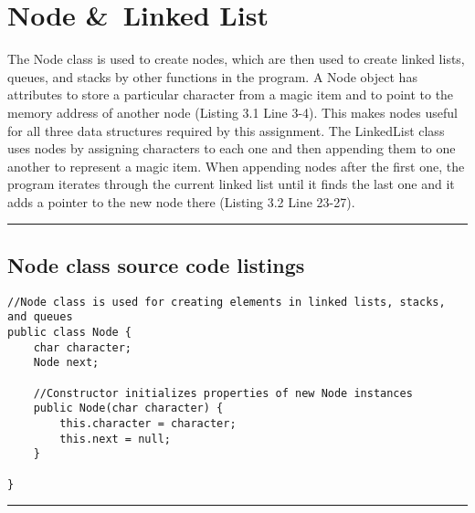 \documentclass[letterpaper, 10pt,DIV=13]{scrartcl}
\numberwithin{equation}{section} %
\numberwithin{figure}{section} %
\numberwithin{table}{section} %
\newcommand{\horrule}[1]{\rule{\linewidth}{#1}} %
\begin{document}
\section{Node \&\ Linked List}\label{operations}
The Node class is used to create nodes, which are then used to create linked lists, queues, and stacks by other functions in the program. A Node object has attributes to store a particular character from a magic item and to point to the memory address of another node (Listing 3.1 Line 3-4). This makes nodes useful for all three data structures required by this assignment. The LinkedList class uses nodes by assigning characters to each one and then appending them to one another to represent a magic item. When appending nodes after the first one, the program iterates through the current linked list until it finds the last one and it adds a pointer to the new node there (Listing 3.2 Line 23-27).

\horrule{0pt}  	%

\subsection{Node class source code listings}
\lstset{numbers=left, numberstyle=\tiny, stepnumber=1, numbersep=5pt, basicstyle=\footnotesize\ttfamily}
\begin{lstlisting}[frame=single, ] 
//Node class is used for creating elements in linked lists, stacks, and queues
public class Node {
	char character;
	Node next;

    //Constructor initializes properties of new Node instances
    public Node(char character) {
        this.character = character;
        this.next = null;
    }

}
\end{lstlisting}

\horrule{0pt}  	%
\end{document}
